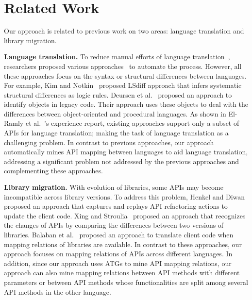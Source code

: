 \section{Related Work}
\label{sec:related}

Our approach is related to previous work on two areas:
language translation and library migration.

\textbf{Language translation.} To reduce manual efforts of language
translation~\cite{samet1981experience}, researchers proposed various
approaches~\cite{hassan2005lightweight,van1999identifying,waters1988program,mossienko2003automated,yasumatsu1995spice, kim2009discovering} to automate the process.
However, all these approaches focus on the syntax or structural differences between
languages. For example, Kim and Notkin~\cite{kim2009discovering} proposed LSdiff
approach that infers systematic structural differences as logic rules.
Deursen et al.~\cite{van1999identifying} proposed an approach to identify
objects in legacy code. Their approach uses these objects to deal with the
differences between object-oriented and procedural languages. As
shown in El-Ramly et al.~\cite{el2006experiment}'s experience
report, existing approaches support only a subset of APIs for language translation;
making the task of language translation as a challenging problem.
In contrast to previous approaches, our approach automatically mines API mapping between
languages to aid language translation, addressing a significant
problem not addressed by the previous approaches and complementing
these approaches.

\textbf{Library migration.} With evolution of libraries, some APIs
may become incompatible across library versions. To address this
problem, Henkel and Diwan~\cite{henkel2005catchup} proposed an approach that captures
and replays API refactoring actions to update the client code.
Xing and Stroulia~\cite{xing2007api} proposed an approach that
recognizes the changes of APIs by comparing the differences between two
versions of libraries. Balaban et al.~\cite{balaban2005refactoring} proposed 
an approach to translate client code when mapping relations of libraries are
available. In contrast to these approaches, our approach focuses on
mapping relations of APIs across different languages. In addition, since
our approach uses ATGs to mine API mapping relations, our approach can also 
mine mapping relations between API methods with different parameters or between
API methods whose functionalities are split among several API methods in the other language.
